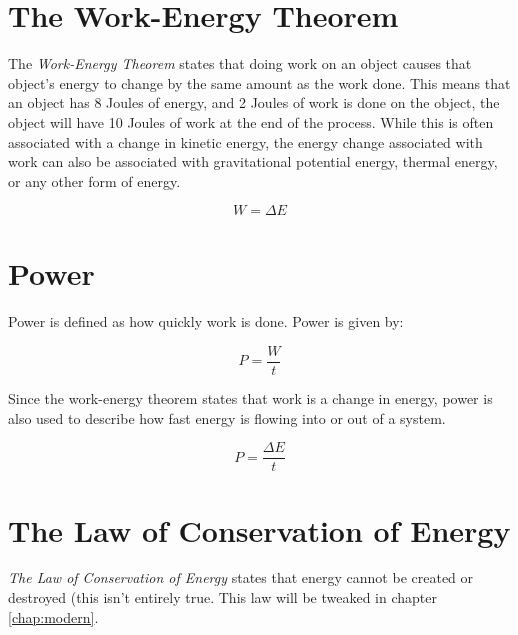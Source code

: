 	
	\section{The Work-Energy Theorem}
	The \textit{Work-Energy Theorem} states that doing work on an object causes that object's energy to change by the same amount as the work done.  This means that an object has 8 Joules of energy, and 2 Joules of work is done on the object, the object will have 10 Joules of work at the end of the process.  	While this is often associated with a change in kinetic energy, the energy change associated with work can also be associated with gravitational potential energy, thermal energy, or any other form of energy.  
	
		\begin{mdframed}[backgroundcolor=orange!20!white]
		\begin{equation}
			W = \Delta E
			\label{equation:workenergy}
		\end{equation}
	\end{mdframed}
	
		\section{Power}
	
	
	Power is defined as how quickly work is done.  Power is given by:
	
	\begin{mdframed}[backgroundcolor=orange!20!white]
		\begin{equation}
			P = \frac{W}{t}
			\label{equation:power}
		\end{equation}
	\end{mdframed}
	
	Since the work-energy theorem states that work is a change in energy, power is also used to describe how fast energy is flowing into or out of a system.
	
	\begin{mdframed}[backgroundcolor=orange!20!white]
		\begin{equation}
			P = \frac{\Delta E}{t}
			\label{equation:poweralt}
		\end{equation}
	\end{mdframed}
	

	
	
	\section{The Law of Conservation of Energy}
	\textit{The Law of Conservation of Energy} states that energy cannot be created or destroyed (this isn't entirely true.  This law will be tweaked in chapter \ref{chap:modern}.
	
